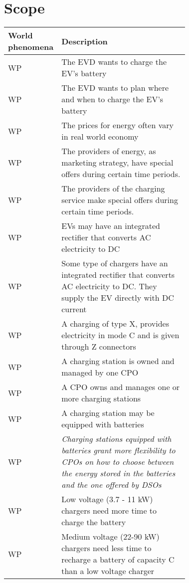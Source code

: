 \section{Scope}
\label{sec:Scope}%
\setcounter{wp}{1}
\newcommand{\wpcount}{\thewp\stepcounter{wp}}
\begin{center}
    \begin{longtable}{|l|p{0.725\linewidth}|}
     \hline
     \textbf{World phenomena} & \textbf{Description} \\
     \hline
     WP\wpcount & The EVD wants to charge the EV's battery \\
     \hline
     WP\wpcount & The EVD wants to plan where and when to charge the EV's battery \\
     \hline
     WP\wpcount & The prices for energy often vary in real world economy \\ 
     \hline
     WP\wpcount & The providers of energy, as marketing strategy, have special offers during certain time periods.\\
     \hline
     WP\wpcount & The providers of the charging service make special offers during certain time periods.\\
     \hline
     WP\wpcount & EVs may have an integrated rectifier that converts AC electricity to DC \\
     \hline
     WP\wpcount & Some type of chargers have an integrated rectifier that converts AC electricity to DC. They supply the EV directly with DC current \\
     \hline
     WP\wpcount & A charging of type X, provides electricity in mode C and is given through Z connectors \\
     \hline
     WP\wpcount & A charging station is owned and managed by one CPO \\
     \hline
     WP\wpcount & A CPO owns and manages one or more charging stations \\
     \hline
     WP\wpcount & A charging station may be equipped with batteries \\
     \hline
     WP\wpcount & \textit{Charging stations equipped with batteries grant more flexibility to CPOs on how to choose between the energy stored in the batteries and the one offered by DSOs} \\
     \hline
     WP\wpcount & Low voltage (3.7 - 11 kW) chargers need more time to charge the battery \\
     \hline
     WP\wpcount & Medium voltage (22-90 kW) chargers need less time to recharge a battery of capacity C than a low voltage charger \\

\end{longtable}
\end{center}
